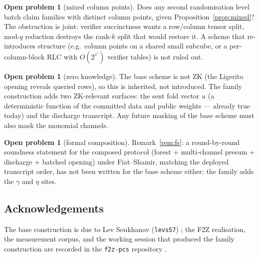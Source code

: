\documentclass[11pt]{article}
\theoremstyle{plain}
\theoremstyle{definition}
\newtheorem{openproblem}[theorem]{Open problem}
\theoremstyle{remark}
\begin{document}
\begin{openproblem}[mixed column points]
Does any second randomisation level batch claim families with distinct
column points, given Proposition~\ref{prop:mixed}? The obstruction is
joint: verifier succinctness wants a row/column tensor split, mod-$q$
reduction destroys the rank-$k$ split that would restore it. A scheme that
re-introduces structure (e.g.\ column points on a shared small subcube, or a
per-column-block RLC with $O(2^{s'})$ verifier tables) is not ruled out.
\end{openproblem}

\begin{openproblem}[zero knowledge]
The base scheme is not ZK (the Ligerito opening reveals queried rows), so
this is inherited, not introduced. The family construction adds two
ZK-relevant surfaces: the sent fold vector $u$ (a deterministic function of
the committed data and public weights --- already true today) and the
discharge transcript. Any future masking of the base scheme must also mask
the monomial channels.
\end{openproblem}

\begin{openproblem}[formal composition]
Remark~\ref{rem:fs}: a round-by-round soundness statement for the composed
protocol (forest + multi-channel presum + discharge + batched opening) under
Fiat--Shamir, matching the deployed transcript order, has not been written
for the base scheme either; the family adds the $\gamma$ and $\eta$ sites.
\end{openproblem}

\subsection*{Acknowledgements}

The base construction is due to Lev Soukhanov (\texttt{levs57})
\cite{Sou}; the F2Z realisation, the measurement corpus, and the working
session that produced the family construction are recorded in the
\texttt{f2z-pcs} repository \cite{F2Zreadme,F2Zdesign}.
\end{document}
